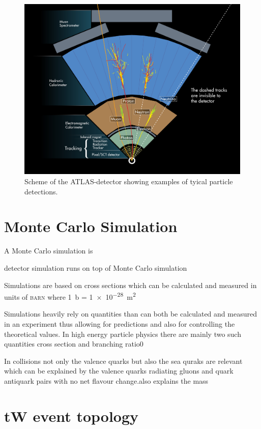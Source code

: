 \begin{figure}[htbp]
  \centering
  \includegraphics[scale=0.6]{figures_LHC/atlas-abstract}
  \caption[Scheme of the ATLAS-detector's detection procedure]{Scheme of the ATLAS-detector showing examples of tyical particle detections. \cite{Pequenao:1095924}}
  \label{fig:atlas_sketch}
\end{figure}

\section{Monte Carlo Simulation}

A Monte Carlo simulation is

detector simulation runs on top of Monte Carlo simulation

Simulations are based on cross sections which can be calculated and measured in units of \textsc{barn} where \SI{1}{\barn} = \SI{1e-28}{\square \metre}

Simulations heavily rely on quantities than can both be calculated and measured in an experiment thus allowing for predictions and also for  controlling the theoretical values.
In high energy particle physics there are mainly two such quantities cross section and branching ratio0

In collisions not only the valence quarks but also the sea quraks are relevant which can be explained by the valence quarks radiating gluons and quark antiquark pairs with no net flavour change.also explains the mass

\section{tW event topology}

